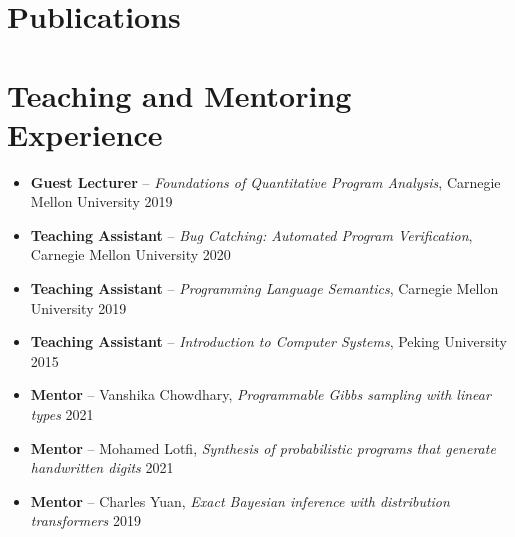 \documentclass[11pt,letterpaper,roman]{moderncv}        %
\begin{document}
\section{Publications}
\vspace{4pt}

\section{Teaching and Mentoring Experience}

\begin{itemize}
  \item \textbf{Guest Lecturer} -- \emph{Foundations of Quantitative Program Analysis}, Carnegie Mellon University \hfill 2019

  \vspace{4pt}

  \item \textbf{Teaching Assistant} -- \emph{Bug Catching: Automated Program Verification}, Carnegie Mellon University \hfill 2020
  \item \textbf{Teaching Assistant} -- \emph{Programming Language Semantics}, Carnegie Mellon University \hfill 2019
  \item \textbf{Teaching Assistant} -- \emph{Introduction to Computer Systems}, Peking University \hfill 2015

  \vspace{4pt}

  \item \textbf{Mentor} -- Vanshika Chowdhary, \emph{Programmable Gibbs sampling with linear types} \hfill 2021
  \item \textbf{Mentor} -- Mohamed Lotfi, \emph{Synthesis of probabilistic programs that generate handwritten digits} \hfill 2021
  \item \textbf{Mentor} -- Charles Yuan, \emph{Exact Bayesian inference with distribution transformers} \hfill 2019
\end{itemize}
\end{document}
